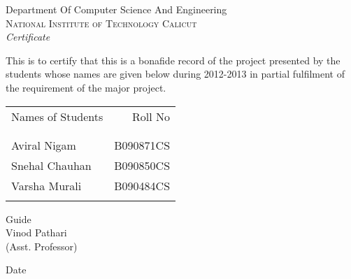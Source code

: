 \newpage
\thispagestyle{empty}

\begin{center}

\LARGE{Department Of Computer Science And Engineering}\\
\normalsize
\textsc{National Institute of Technology Calicut}\\[2.0cm]

\emph{\LARGE Certificate}\\[2.0cm]
\end{center}
\normalsize This is to certify that this is a bonafide record of the project presented by the students whose names are given below during 2012-2013 in partial fulfilment of the requirement of the major project.\\[1.0cm]

\begin{table}[h]
\centering
\begin{tabular}{lr}
Names of Students & Roll No \\ \\ \hline
\\
Aviral Nigam & B090871CS \\ 
Snehal Chauhan & B090850CS \\
Varsha Murali & B090484CS \\ \\ \hline
\end{tabular}
\end{table}
\vspace{3.0cm}
\begin{flushleft}
Guide\\[0.3cm]
Vinod Pathari\\[0.1cm]
(Asst. Professor)\\
\end{flushleft}

\vspace{-2.5cm}
\begin{flushright}
Date
\end{flushright}
